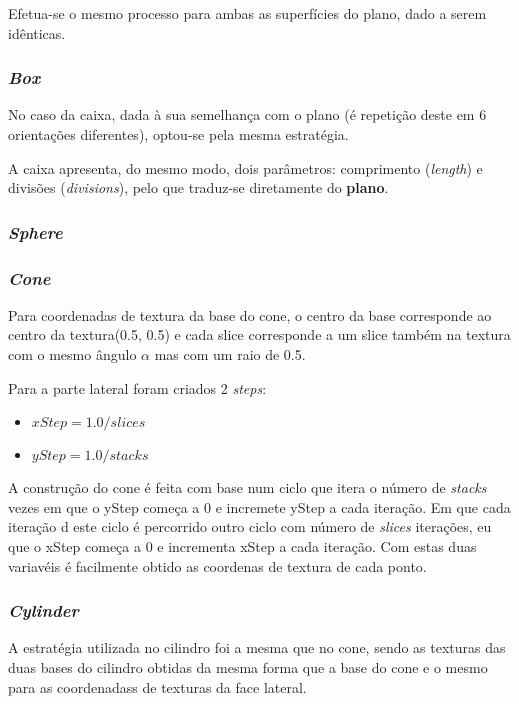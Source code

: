 \documentclass[relatorio.tex]{subfiles}
\begin{document}
Efetua-se o mesmo processo para ambas as 
superfícies do plano, dado a serem 
idênticas.

\subsubsection{\textit{Box}}

No caso da caixa, dada à sua semelhança com o plano 
(é repetição deste em 6 orientações diferentes),
optou-se pela mesma estratégia.

A caixa apresenta, do mesmo modo, dois parâmetros: comprimento (\textit{length})
e divisões (\textit{divisions}), pelo que traduz-se 
diretamente do \textbf{plano}.

\subsubsection{\textit{Sphere}}

\subsubsection{\textit{Cone}}
Para coordenadas de textura da base do cone, o centro da base
corresponde ao centro da textura(0.5, 0.5) e cada slice corresponde
a um slice também na textura com o mesmo ângulo $\alpha$ mas com um raio
de 0.5.

Para a parte lateral foram criados 2 \textit{steps}:
\begin{itemize}
    \item $xStep = 1.0 / slices$
    \item $yStep = 1.0 / stacks$
\end{itemize}

A construção do cone é feita com base num ciclo que itera o número de \textit{stacks}
vezes em que o yStep começa a 0 e incremete yStep a cada iteração. Em que cada iteração d
este ciclo é percorrido outro ciclo com número de \textit{slices} iterações, eu que o xStep começa
a 0 e incrementa xStep a cada iteração. Com estas duas variavéis é facilmente obtido as coordenas de textura
de cada ponto.


\subsubsection{\textit{Cylinder}}
A estratégia utilizada no cilindro foi a mesma que no cone, sendo
as texturas das duas bases do cilindro obtidas da mesma forma que
a base do cone e o mesmo para as coordenadass de texturas da face lateral.
\end{document}
